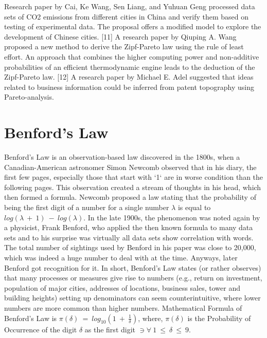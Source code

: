 \documentclass[conference]{IEEEtran}
\begin{document}
Research paper by Cai, Ke Wang, Sen Liang, and Yuhuan Geng processed data sets of CO2 emissions from different cities in China and verify them based on testing of experimental data. The proposal offers a modified model to explore the development of Chinese cities. [11] A research paper by Qiuping A. Wang proposed a new method to derive the Zipf-Pareto law using the rule of least effort. An approach that combines the higher computing power and non-additive probabilities of an efficient thermodynamic engine leads to the deduction of the Zipf-Pareto law. [12] A research paper by Michael E. Adel suggested that ideas related to business information could be inferred from patent topography using Pareto-analysis. 
\section{Benford's Law}
Benford's Law is an observation-based law discovered in the  1800s, when a Canadian-American astronomer Simon Newcomb observed that in his diary, the first few pages, especially those that start with `1` are in worse condition than the following pages. This observation created a stream of thoughts in his head, which then formed a formula. Newcomb proposed a law stating that  the probability of being the first digit of a number for a single number $\lambda$ is equal to $log(\lambda\ +\ 1)\ -\ log(\lambda)$. In the late 1900s, the phenomenon was noted again  by a physicist, Frank Benford, who applied the then known formula to many data sets and to his surprise was virtually all data sets show correlation with words. The total number of sightings used by Benford in his paper was close to 20,000, which was indeed a huge number to deal with at the time. Anyways, later Benford got recognition for it. In short, Benford's Law states (or rather observes) that many processes or measures give rise to numbers (e.g., return on investment, population of major cities, addresses of locations, business sales, tower and building heights) setting up denominators can seem counterintuitive, where lower numbers are more common than higher numbers. Mathematical Formula of Benford's Law is $\pi(\delta)\ =\ {log}_{10}{\left(1\ +\ \frac{1}{\delta}\right)}$, where, $\pi(\delta)$ is the Probability of Occurrence of the digit $\delta$ as the first digit $\ni\forall\ 1\ \le\ \delta\ \le\ 9$. 
\end{document}
